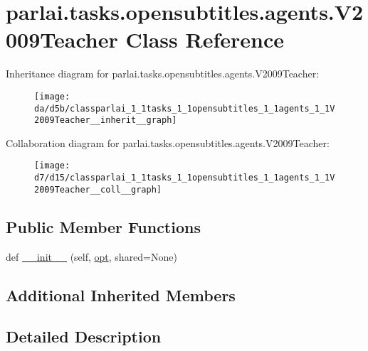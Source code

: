 \hypertarget{classparlai_1_1tasks_1_1opensubtitles_1_1agents_1_1V2009Teacher}{}\section{parlai.\+tasks.\+opensubtitles.\+agents.\+V2009\+Teacher Class Reference}
\label{classparlai_1_1tasks_1_1opensubtitles_1_1agents_1_1V2009Teacher}


Inheritance diagram for parlai.\+tasks.\+opensubtitles.\+agents.\+V2009\+Teacher\+:
\nopagebreak
\begin{figure}[H]
\begin{center}
\leavevmode
\texttt{[image: da/d5b/classparlai\_1\_1tasks\_1\_1opensubtitles\_1\_1agents\_1\_1V2009Teacher\_\_inherit\_\_graph]}
\end{center}
\end{figure}


Collaboration diagram for parlai.\+tasks.\+opensubtitles.\+agents.\+V2009\+Teacher\+:
\nopagebreak
\begin{figure}[H]
\begin{center}
\leavevmode
\texttt{[image: d7/d15/classparlai\_1\_1tasks\_1\_1opensubtitles\_1\_1agents\_1\_1V2009Teacher\_\_coll\_\_graph]}
\end{center}
\end{figure}
\subsection*{Public Member Functions}
\begin{DoxyCompactItemize}
\item 
def \hyperlink{classparlai_1_1tasks_1_1opensubtitles_1_1agents_1_1V2009Teacher_ad42d78a9d6ecfb02d6807452e3648fbe}{\+\_\+\+\_\+init\+\_\+\+\_\+} (self, \hyperlink{classparlai_1_1core_1_1teachers_1_1FbDialogTeacher_af7a9ec497b9cd0292d7b8fa220da7c28}{opt}, shared=None)
\end{DoxyCompactItemize}
\subsection*{Additional Inherited Members}


\subsection{Detailed Description}


